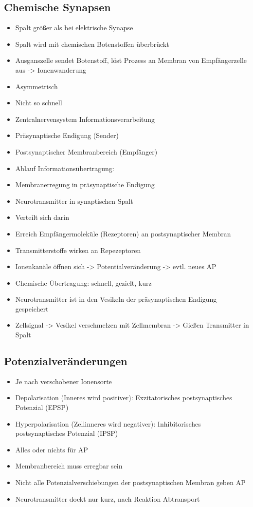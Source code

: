 \documentclass[a4paper,10pt,oneside]{article}
\begin{document}
\subsection{Chemische Synapsen}
\begin{itemize}
	\item Spalt größer als bei elektrische Synapse
	\item Spalt wird mit chemischen Botenstoffen überbrückt
	\item Ausganszelle sendet Botenstoff, löst Prozess an Membran von Empfängerzelle aus -> Ionenwanderung
	\item Asymmetrisch
	\item Nicht so schnell
	\item Zentralnervensystem Informationsverarbeitung
	\item Präsynaptische Endigung (Sender)
	\item Postsynaptischer Membranbereich (Empfänger)
	\item Ablauf Informationsübertragung:
	\item Membranerregung in präsynaptische Endigung
	\item Neurotransmitter in synaptischen Spalt
	\item Verteilt sich darin
	\item Erreich Empfängermoleküle (Rezeptoren) an postsynaptischer Membran
	\item Transmitterstoffe wirken an Repezeptoren
	\item Ionenkanäle öffnen sich -> Potentialveränderung -> evtl. neues AP
	\item Chemische Übertragung: schnell, gezielt, kurz
	\item Neurotransmitter ist in den Vesikeln der präsynaptischen Endigung gespeichert
	\item Zellsignal -> Vesikel verschmelzen mit Zellmembran -> Gießen Transmitter in Spalt
\end{itemize}

\subsection{Potenzialveränderungen}
\begin{itemize}
	\item Je nach verschobener Ionensorte
	\item Depolarisation (Inneres wird positiver): Exzitatorisches postsynaptisches Potenzial (EPSP)
	\item Hyperpolarisation (Zellinneres wird negativer): Inhibitorisches postsynaptisches Potenzial (IPSP)
	\item Alles oder nichts für AP
	\item Membranbereich muss erregbar sein
	\item Nicht alle Potenzialverschiebungen der postsynaptischen Membran geben AP
	\item Neurotransmitter dockt nur kurz, nach Reaktion Abtransport
\end{itemize}
\end{document}
